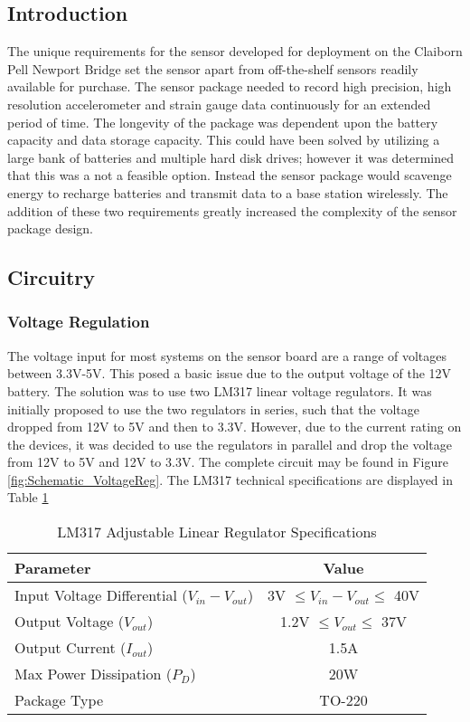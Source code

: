 \subsection{Introduction}
\indent The unique requirements for the sensor developed for deployment on the Claiborn Pell Newport Bridge set the sensor apart from off-the-shelf sensors readily available for purchase.
The sensor package needed to record high precision, high resolution accelerometer and strain gauge data continuously for an extended period of time. 
The longevity of the package was dependent upon the battery capacity and data storage capacity. 
This could have been solved by utilizing a large bank of batteries and multiple hard disk drives; however it was determined that this was a not a feasible option. 
Instead the sensor package would scavenge energy to recharge batteries and transmit data to a base station wirelessly. 
The addition of these two requirements greatly increased the complexity of the sensor package design. \\

\indent 

\subsection{Circuitry}

\subsubsection{Voltage Regulation}
The voltage input for most systems on the sensor board are a range of voltages between 3.3V-5V.
This posed a basic issue due to the output voltage of the 12V battery. 
The solution was to use two LM317 linear voltage regulators.
It was initially proposed to use the two regulators in series, such that the voltage dropped from 12V to 5V and then to 3.3V.
However, due to the current rating on the devices, it was decided to use the regulators in parallel and drop the voltage from 12V to 5V and 12V to 3.3V.
The complete circuit may be found in Figure \ref{fig:Schematic_VoltageReg}.
The LM317 technical specifications are displayed in Table \ref{tab:LM317} 

\begin{table}[h]
\centering
\begin{tabular}{|l|c|}
\hline
\textbf{Parameter} & \textbf{Value}\\
\hline
Input Voltage Differential ($V_{in}-V_{out}$)& 3V $\le V_{in}-V_{out} \le$ 40V\\
Output Voltage ($V_{out}$) & 1.2V $\le V_{out} \le$ 37V\\
Output Current ($I_{out}$) & 1.5A\\
Max Power Dissipation ($P_{D}$) & 20W\\
Package Type				   & TO-220\\
\hline
\end{tabular}
\caption{LM317 Adjustable Linear Regulator Specifications}
\label{tab:LM317}
\end{table}

